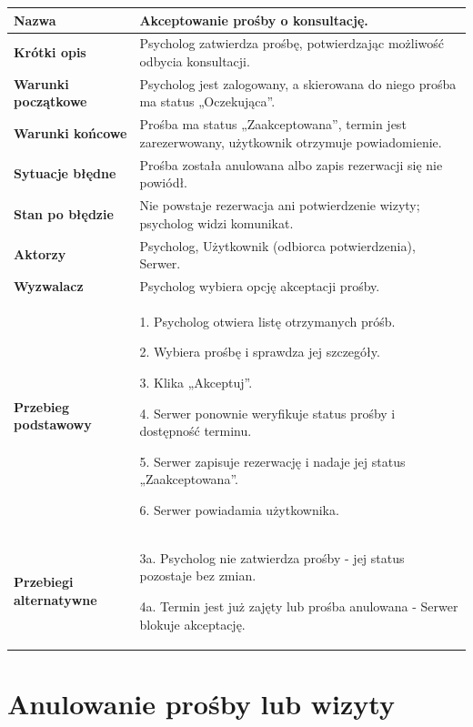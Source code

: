 \documentclass[11pt,a4paper]{article}
\renewcommand{\arraystretch}{1.3}
\newcommand{\pole}[2]{
\textbf{#1} & #2 \\ \hline
}
\begin{document}
\begin{tabularx}{\textwidth}{|p{3.9cm}|Y|}
\hline

\pole{Nazwa}{
Akceptowanie prośby o konsultację.
}

\pole{Krótki opis}{
Psycholog zatwierdza prośbę,
potwierdzając możliwość odbycia konsultacji.
}

\pole{Warunki początkowe}{
Psycholog jest zalogowany,
a skierowana do niego prośba
ma status „Oczekująca”.
}

\pole{Warunki końcowe}{
Prośba ma status „Zaakceptowana”,
termin jest zarezerwowany,
użytkownik otrzymuje powiadomienie.
}

\pole{Sytuacje błędne}{
Prośba została anulowana albo zapis
rezerwacji się nie powiódł.
}

\pole{Stan po błędzie}{
Nie powstaje rezerwacja ani potwierdzenie
wizyty; psycholog widzi komunikat.
}

\pole{Aktorzy}{
Psycholog,
Użytkownik (odbiorca potwierdzenia),
Serwer.
}

\pole{Wyzwalacz}{
Psycholog wybiera opcję akceptacji prośby.
}

\pole{Przebieg podstawowy}{
1. Psycholog otwiera listę otrzymanych próśb.\par
2. Wybiera prośbę i sprawdza jej szczegóły.\par
3. Klika „Akceptuj”.\par
4. Serwer ponownie weryfikuje status prośby
i dostępność terminu.\par
5. Serwer zapisuje rezerwację
i nadaje jej status „Zaakceptowana”.\par
6. Serwer powiadamia użytkownika.
}

\pole{Przebiegi alternatywne}{
3a. Psycholog nie zatwierdza prośby -
jej status pozostaje bez zmian.\par
4a. Termin jest już zajęty lub prośba
anulowana - Serwer blokuje akceptację.
}

\end{tabularx}
\endgroup

\clearpage

\section*{Anulowanie prośby lub wizyty}

\begingroup
\small
\renewcommand{\arraystretch}{1.14}
\end{document}
